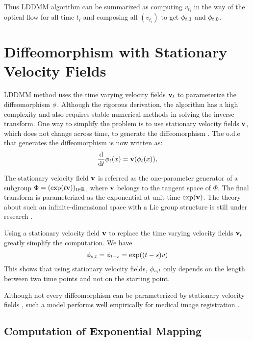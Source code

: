 \documentclass[letterpaper,12pt]{article}
\begin{document}
Thus LDDMM algorithm can be summarized as computing $v_{t_i}$ in the way of the optical flow for all time $t_i$ and composing all $(v_{t_i})$ to get $\phi_{t, 1}$ and $\phi_{t, 0}$.



\section{Diffeomorphism with Stationary Velocity Fields}

LDDMM method \cite{Beg2005Computing} uses the time varying velocity fields $\mathbf{v}_t$ to parameterize the diffeomorphism $\phi$. Although the rigorous derivation, the algorithm has a high complexity and also requires stable numerical methods in solving the inverse transform. One way to simplify the problem is to use stationary velocity fields $\mathbf{v}$, which does not change across time, to generate the diffeomorphism \cite{Arsigny2006,Ashburner2007,Vercauteren2007,Vercauteren2008Symmetric,Hernandez2009}. The o.d.e that generates the diffeomorphism is now written as:
\begin{align}
\frac{\text{d}}{\text{d} t} \phi_t(x) = \mathbf{v}(\phi_t(x)), 
\end{align}

The stationary velocity field $\mathbf{v}$ is referred as the one-parameter generator of a subgroup $\Phi=(\exp(t\mathbf{v}))_{t \in \mathbb{R}}$, where $\mathbf{v}$ belongs to the tangent space of $\Phi$. The final transform is parameterized as the exponential at unit time $\exp(\mathbf{v})$. The theory about such an infinite-dimensional space with a Lie group structure is still under research \cite{Arsigny2006, Vercauteren2008Symmetric, Sternberg1964, Mahony2002}.  

Using a stationary velocity field $\mathbf{v}$ to replace the time varying velocity fields $\mathbf{v}_t$ greatly simplify the computation. We have
\begin{align}
\phi_{s,t} = \phi_{t-s} = \exp((t-s)v)
\end{align}
This shows that using stationary velocity fields, $\phi_{s,t}$ only depends on the length between two time points and not on the starting point. 

Although not every diffeomorphism can be parameterized by stationary velocity fields \cite{Ashburner2007}, such a model performs well empirically for medical image registration \cite{Hernandez2009, Vercauteren2009}.





\subsection{Computation of Exponential Mapping}
\end{document}
